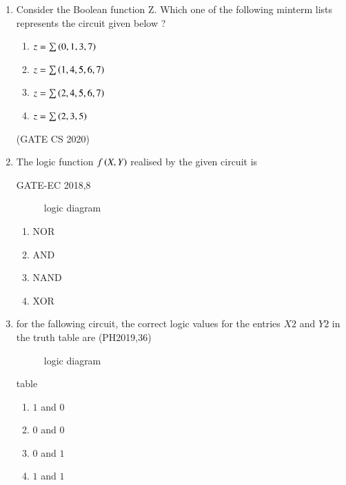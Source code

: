 \begin{enumerate}
\begin{enumerate}
	      \end{enumerate}
	\item Consider the Boolean function Z. Which one of the following minterm lists represents the
	      circuit given below ?
	      \\
	      
	      \begin{enumerate}[label=\Alph*.]
		      \item $z=\sum{\ensuremath{\left(0,1,3,7\right)}}$
		      \item $z=\sum{\ensuremath{\left(1,4,5,6,7\right)}}$
		      \item $z=\sum{\ensuremath{\left(2,4,5,6,7\right)}}$
		      \item $z=\sum{\ensuremath{\left(2,3,5\right)}}$
	      \end{enumerate}
	      \hfill (GATE CS 2020)
	

\item The logic function $f\left(X,Y\right)$ realised by the given circuit is

\hfill{GATE-EC 2018,8}
		\begin{figure}[H]
\centering
			
			\caption{logic diagram}
			\label{figure:}
		\end{figure}

		\begin{enumerate}
			\item NOR
			\item AND
			\item NAND
			\item XOR

		\end{enumerate}
                            
 \item for the fallowing circuit, the correct logic values for the entries $X2$ and $Y2$ in the truth table are
\hfill(PH2019,36)





\begin{figure}[H]
        \centering
        
        \caption{logic diagram}
        \label{fig}
       \end{figure}


		\begin{table}[H]
			\centering
			
			\caption{table}
			\label{table:}
		\end{table}



   \begin{enumerate}
\item $1$ and $0$
\item $0$ and $0$
\item $0$ and $1$
\item $1$ and $1$

\end{enumerate}



\end{enumerate}


